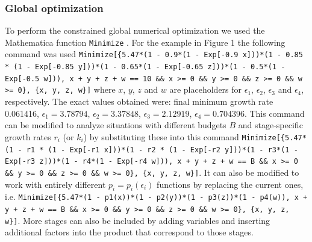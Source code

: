 \documentclass[onecolumn]{article}
\begin{document}
\subsubsection*{Global optimization}
To perform the constrained global numerical optimization we used the Mathematica function {\tt Minimize} \citep{Mathematica}. For the example in Figure 1 the following command was used {\tt Minimize[\{5.47*(1 - 0.9*(1 - Exp[-0.9 x]))*(1 - 0.85 * (1 - Exp[-0.85 y]))*(1 - 0.65*(1 - Exp[-0.65 z]))*(1 - 0.5*(1 - Exp[-0.5 w])), x + y + z + w == 10 \&\& x >= 0 \&\& y >= 0 \&\& z >= 0 \&\& w >= 0\},  \{x, y, z, w\}]} where $x$, $y$, $z$ and $w$ are placeholders for $\epsilon_1$, $\epsilon_2$, $\epsilon_3$ and $\epsilon_4$, respectively. The exact values obtained were: final minimum growth rate 0.061416, $\epsilon_1=3.78794$, $\epsilon_2=3.37848$, $\epsilon_3=2.12919$, $\epsilon_4=0.704396$. This command can be modified to analyze situations with different budgets $B$ and stage-specific growth rates $r_i$ (or $k_i$) by substituting these into this command {\tt Minimize[\{5.47*(1 - r1 * (1 - Exp[-r1 x]))*(1 - r2 * (1 - Exp[-r2 y]))*(1 - r3*(1 - Exp[-r3 z]))*(1 - r4*(1 - Exp[-r4 w])), x + y + z + w == B \&\& x >= 0 \&\& y >= 0 \&\& z >= 0 \&\& w >= 0\},  \{x, y, z, w\}]}. It can also be modified to work with entirely different $p_i=p_i(\epsilon_i)$ functions by replacing the current ones, i.e. {\tt Minimize[\{5.47*(1 - p1(x))*(1 - p2(y))*(1 - p3(z))*(1 - p4(w)), x + y + z + w == B \&\& x >= 0 \&\& y >= 0 \&\& z >= 0 \&\& w >= 0\},  \{x, y, z, w\}]}. More stages can also be included by adding variables and inserting additional factors into the product that correspond to those stages.
\end{document}
